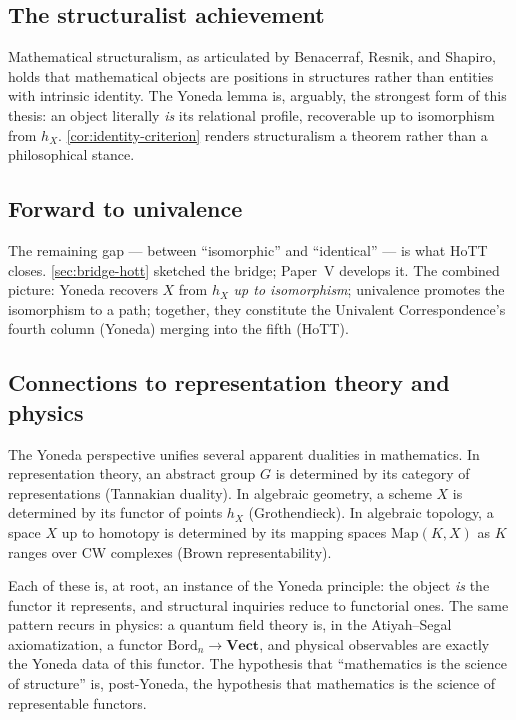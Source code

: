 \documentclass[12pt]{article}
\theoremstyle{definition}
\theoremstyle{remark}
\begin{document}
\subsection{The structuralist achievement}

Mathematical structuralism, as articulated by Benacerraf, Resnik, and Shapiro, holds that mathematical objects are positions in structures rather than entities with intrinsic identity. The Yoneda lemma is, arguably, the strongest form of this thesis: an object literally \emph{is} its relational profile, recoverable up to isomorphism from $h_X$. \cref{cor:identity-criterion} renders structuralism a theorem rather than a philosophical stance.

\subsection{Forward to univalence}

The remaining gap --- between ``isomorphic'' and ``identical'' --- is what HoTT closes. \cref{sec:bridge-hott} sketched the bridge; Paper~V develops it. The combined picture: Yoneda recovers $X$ from $h_X$ \emph{up to isomorphism}; univalence promotes the isomorphism to a path; together, they constitute the Univalent Correspondence's fourth column (Yoneda) merging into the fifth (HoTT).

\subsection{Connections to representation theory and physics}

The Yoneda perspective unifies several apparent dualities in mathematics. In representation theory, an abstract group $G$ is determined by its category of representations (Tannakian duality). In algebraic geometry, a scheme $X$ is determined by its functor of points $h_X$ (Grothendieck). In algebraic topology, a space $X$ up to homotopy is determined by its mapping spaces $\mathrm{Map}(K, X)$ as $K$ ranges over CW complexes (Brown representability).

Each of these is, at root, an instance of the Yoneda principle: the object \emph{is} the functor it represents, and structural inquiries reduce to functorial ones. The same pattern recurs in physics: a quantum field theory is, in the Atiyah--Segal axiomatization, a functor $\mathrm{Bord}_n \to \mathbf{Vect}$, and physical observables are exactly the Yoneda data of this functor. The hypothesis that ``mathematics is the science of structure'' is, post-Yoneda, the hypothesis that mathematics is the science of representable functors.
\end{document}
